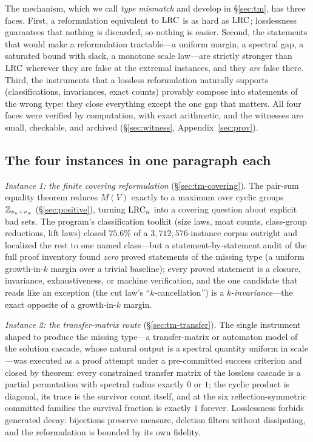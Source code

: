The mechanism, which we call \emph{type mismatch} and develop in
\S\ref{sec:tm}, has three faces. First, a reformulation equivalent to
$\mathrm{LRC}$ is as hard as $\mathrm{LRC}$; losslessness guarantees that nothing is
discarded, so nothing is easier. Second, the statements that would make a
reformulation tractable---a uniform margin, a spectral gap, a saturated
bound with slack, a monotone scale law---are strictly stronger than $\mathrm{LRC}$
wherever they are false at the extremal instances, and they \emph{are}
false there. Third, the instruments that a lossless reformulation
naturally supports (classifications, invariances, exact counts) provably
compose into statements of the wrong type: they close everything except
the one gap that matters. All four faces were verified by computation,
with exact arithmetic, and the witnesses are small, checkable, and
archived (\S\ref{sec:witness}, Appendix~\ref{sec:prov}).

\subsection{The four instances in one paragraph each}

\emph{Instance 1: the finite covering reformulation}
(\S\ref{sec:tm-covering}). The pair-sum equality theorem reduces
$M(V)$ exactly to a maximum over cyclic groups $\mathbb{Z}_{v_u+v_w}$
(\S\ref{sec:positive}), turning $\mathrm{LRC}_n$ into a covering question about
explicit bad sets. The program's classification toolkit (size laws, moat
counts, class-group reductions, lift laws) closed $75.6\%$ of a
$3{,}712{,}576$-instance corpus outright and localized the rest to one
named class---but a statement-by-statement audit of the full proof
inventory found \emph{zero} proved statements of the missing type (a
uniform growth-in-$k$ margin over a trivial baseline); every proved
statement is a closure, invariance, exhaustiveness, or machine
verification, and the one candidate that reads like an exception (the cut
law's ``$k$-cancellation'') is a $k$-\emph{invariance}---the exact
opposite of a growth-in-$k$ margin.

\emph{Instance 2: the transfer-matrix route} (\S\ref{sec:tm-transfer}).
The single instrument shaped to produce the missing type---a
transfer-matrix or automaton model of the solution cascade, whose natural
output is a spectral quantity uniform in scale---was executed as a proof
attempt under a pre-committed success criterion and closed by theorem:
every constrained transfer matrix of the lossless cascade is a partial
permutation with spectral radius exactly $0$ or $1$; the cyclic product is
diagonal, its trace is the survivor count itself, and at the six
reflection-symmetric committed families the survival fraction is exactly
$1$ forever. Losslessness forbids generated decay: bijections preserve
measure, deletion filters without dissipating, and the reformulation is
bounded by its own fidelity.

